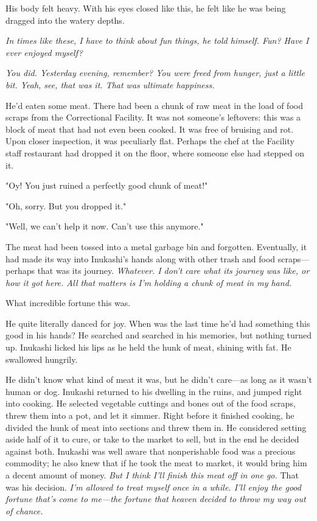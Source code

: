 His body felt heavy. With his eyes closed like this, he felt like he was
being dragged into the watery depths.

\emph{In times like these, I have to think about fun things, he told himself.
Fun? Have I ever enjoyed myself?}

\emph{You did. Yesterday evening, remember? You were freed from hunger, just a
little bit. Yeah, see, that was it. That was ultimate happiness.}

\mybreak

He'd eaten some meat. There had been a chunk of raw meat in the load of
food scraps from the Correctional Facility. It was not someone's
leftovers: this was a block of meat that had not even been cooked. It
was free of bruising and rot. Upon closer inspection, it was peculiarly
flat. Perhaps the chef at the Facility staff restaurant had dropped it
on the floor, where someone else had stepped on it.

"Oy! You just ruined a perfectly good chunk of meat!"

"Oh, sorry. But you dropped it."

"Well, we can't help it now. Can't use this anymore."

The meat had been tossed into a metal garbage bin and forgotten.
Eventually, it had made its way into Inukashi's hands along with other
trash and food scraps---perhaps that was its journey. \emph{Whatever. I don't
care what its journey was like, or how it got here. All that matters is
I'm holding a chunk of meat in my hand.}

What incredible fortune this was.

He quite literally danced for joy. When was the last time he'd had
something this good in his hands? He searched and searched in his
memories, but nothing turned up. Inukashi licked his lips as he held the
hunk of meat, shining with fat. He swallowed hungrily.

He didn't know what kind of meat it was, but he didn't care---as long as
it wasn't human or dog. Inukashi returned to his dwelling in the ruins,
and jumped right into cooking. He selected vegetable cuttings and bones
out of the food scraps, threw them into a pot, and let it simmer. Right
before it finished cooking, he divided the hunk of meat into sections
and threw them in. He considered setting aside half of it to cure, or
take to the market to sell, but in the end he decided against both.
Inukashi was well aware that nonperishable food was a precious
commodity; he also knew that if he took the meat to market, it would
bring him a decent amount of money. \emph{But I think I'll finish this meat
off in one go.} That was his decision. \emph{I'm allowed to treat myself once
in a while. I'll enjoy the good fortune that's come to me---the fortune
that heaven decided to throw my way out of chance.}

